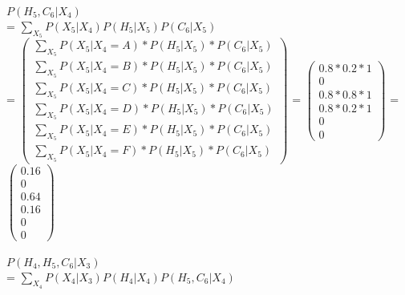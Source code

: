 \documentclass{article}
\begin{document}
\noindent 
$P(H_5, C_6 \vert X_4)$ \\ 

\indent 
= $\sum_{X_5} P(X_5 \vert X_4) P(H_5 \vert X_5) P(C_6 \vert X_5)$ \\ 

\indent
= $\left(\begin{array}{c} 
        \sum_{X_5} P(X_5 \vert X_4 = A) * P(H_5 \vert X_5) * P(C_6 \vert X_5)\\
        \sum_{X_5} P(X_5 \vert X_4 = B) * P(H_5 \vert X_5) * P(C_6 \vert X_5) \\ 
        \sum_{X_5} P(X_5 \vert X_4 = C) * P(H_5 \vert X_5) * P(C_6 \vert X_5) \\
        \sum_{X_5} P(X_5 \vert X_4 = D) * P(H_5 \vert X_5) * P(C_6 \vert X_5) \\
        \sum_{X_5} P(X_5 \vert X_4 = E) * P(H_5 \vert X_5) * P(C_6 \vert X_5) \\
        \sum_{X_5} P(X_5 \vert X_4 = F) * P(H_5 \vert X_5) * P(C_6 \vert X_5)
    \end{array}\right)$ 
= $\left(\begin{array}{c} 
        0.8*0.2*1\\
        0 \\ 
        0.8*0.8*1 \\
        0.8*0.2*1\\
        0 \\
        0
    \end{array}\right)$ = 
$\left(\begin{array}{c} 
        0.16\\
        0 \\ 
        0.64\\
        0.16\\
        0 \\
        0
    \end{array}\right)$ \\ 
\\ 

\noindent 
$P(H_4, H_5, C_6 \vert X_3)$ \\ 

\indent 
= $\sum_{X_4} P(X_4 \vert X_3) P(H_4 \vert X_4) P(H_5, C_6 \vert X_4)$ \\ 
\end{document}
